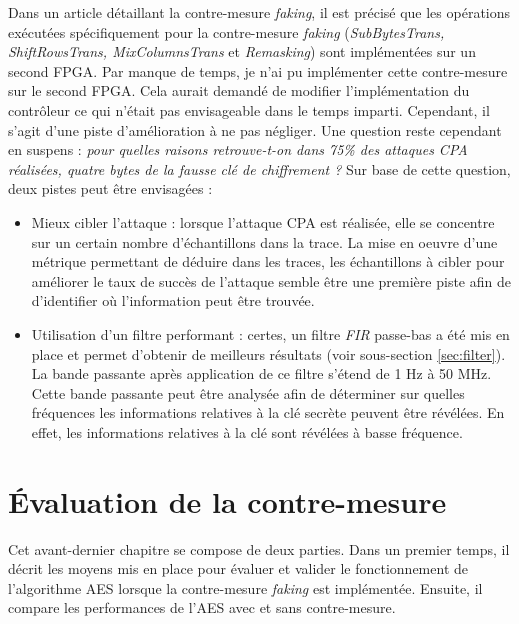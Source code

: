 \documentclass[oneside]{book}
\begin{document}
Dans un article \cite{lumbiarres-lopez_faking_2018} détaillant la contre-mesure \textit{faking}, il est précisé que les opérations exécutées spécifiquement pour la contre-mesure \textit{faking} (\textit{SubBytesTrans, ShiftRowsTrans, MixColumnsTrans} et \textit{Remasking}) sont implémentées sur un second FPGA. Par manque de temps, je n'ai pu implémenter cette contre-mesure sur le second FPGA. Cela aurait demandé de modifier l'implémentation du contrôleur ce qui n'était pas envisageable dans le temps imparti. Cependant, il s'agit d'une piste d'amélioration à ne pas négliger. Une question reste cependant en suspens : \textit{pour quelles raisons retrouve-t-on dans 75\% des attaques CPA réalisées, quatre bytes de la fausse clé de chiffrement ?} Sur base de cette question, deux pistes peut être envisagées : 
\begin{itemize}
\item Mieux cibler l'attaque : lorsque l'attaque CPA est réalisée, elle se concentre sur un certain nombre d'échantillons dans la trace. La mise en oeuvre d'une métrique permettant de déduire dans les traces, les échantillons à cibler pour améliorer le taux de succès de l'attaque semble être une première piste afin de d'identifier où l'information peut être trouvée.
\item Utilisation d'un filtre performant : certes, un filtre \textit{FIR} passe-bas a été mis en place et permet d'obtenir de meilleurs résultats (voir sous-section \ref{sec:filter}). La bande passante après application de ce filtre s'étend de 1 Hz à 50 MHz. Cette bande passante peut être analysée afin de déterminer sur quelles fréquences les informations relatives à la clé secrète peuvent être révélées. En effet, les informations relatives à la clé sont révélées à basse fréquence.
\end{itemize}

\newpage


\chapter{Évaluation de la contre-mesure}
\label{chap:performances}

Cet avant-dernier chapitre se compose de deux parties. Dans un premier temps, il décrit les moyens mis en place pour évaluer et valider le fonctionnement de l'algorithme AES lorsque la contre-mesure \textit{faking} est implémentée. Ensuite, il compare les performances de l'AES avec et sans contre-mesure.
\end{document}

